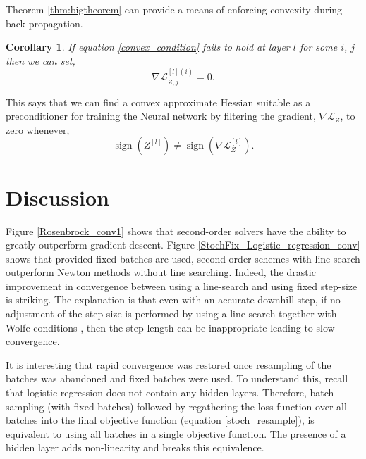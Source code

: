 \documentclass[nohyperref]{article}
\theoremstyle{plain}
\newtheorem{corollary}[theorem]{Corollary}
\theoremstyle{definition}
\theoremstyle{remark}
\DeclareMathOperator*{\sgn}{sign}
\begin{document}
Theorem \ref{thm:bigtheorem} can provide a means of enforcing convexity during back-propagation. 
\begin{corollary}
If equation \ref{convex_condition} fails to hold at layer $l$ for some $i$, $j$ then we can set,
\begin{equation}
\nabla \mathcal{L}^{[l](i)}_{Z,j} =0.
\end{equation}
\end{corollary}
This says that we can find a convex approximate Hessian suitable as a preconditioner for training the Neural network by filtering the gradient, $\nabla \mathcal{L}_{Z}$, to zero whenever,  
\begin{equation}
\sgn{\left(Z^{[l]}\right)}\neq \sgn{\left(\nabla \mathcal{L}^{[l]}_{Z} \right)}.
\end{equation}

\section{Discussion}

Figure \ref{Rosenbrock_conv1} shows that second-order solvers have the ability to greatly outperform gradient descent. Figure \ref{StochFix_Logistic_regression_conv} shows that provided fixed batches are used, second-order schemes with line-search outperform Newton methods without line searching. Indeed, the drastic improvement in convergence between using a line-search and using fixed step-size is striking. The explanation is that even with an accurate downhill step, if no adjustment of the step-size is performed by using a line search together with Wolfe conditions \citep[see][]{Nocedal:Wright}, then the step-length can be inappropriate leading to slow convergence. 
 
It is interesting that rapid convergence was restored once resampling of the batches was abandoned and fixed batches were used. To understand this, recall that logistic regression does not contain any hidden layers. Therefore, batch sampling (with fixed batches) followed by regathering the loss function over all batches into the final objective function (equation \ref{stoch_resample}), is equivalent to using all batches in a single objective function. The presence of a hidden layer adds non-linearity and breaks this equivalence.
\end{document}
